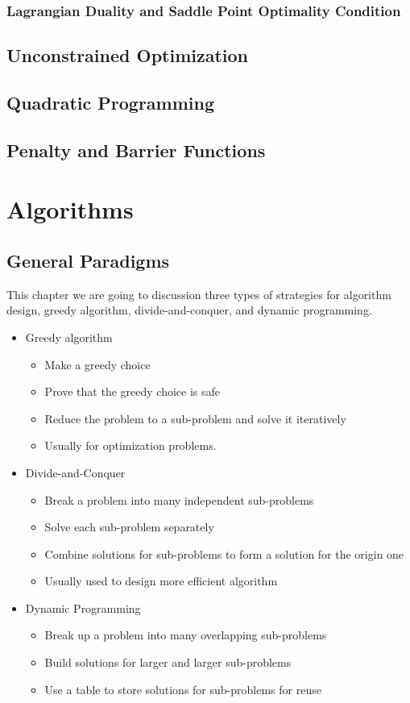 			\section{Lagrangian Duality and Saddle Point Optimality Condition}

		\chapter{Unconstrained Optimization}

		\chapter{Quadratic Programming}

		\chapter{Penalty and Barrier Functions}

	\part{Algorithms}\label{Algo}
		\chapter{General Paradigms}
			This chapter we are going to discussion three types of strategies for algorithm design, greedy algorithm, divide-and-conquer, and dynamic programming.
			\begin{itemize}
				\item Greedy algorithm
				\begin{itemize}
					\item Make a greedy choice
					\item Prove that the greedy choice is safe
					\item Reduce the problem to a sub-problem and solve it iteratively
					\item Usually for optimization problems.
				\end{itemize}
				\item Divide-and-Conquer
				\begin{itemize}
					\item Break a problem into many independent sub-problems
					\item Solve each sub-problem separately
					\item Combine solutions for sub-problems to form a solution for the origin one
					\item Usually used to design more efficient algorithm
				\end{itemize}
				\item Dynamic Programming
				\begin{itemize}
					\item Break up a problem into many overlapping sub-problems
					\item Build solutions for larger and larger sub-problems
					\item Use a table to store solutions for sub-problems for reuse
				\end{itemize}
			\end{itemize}

